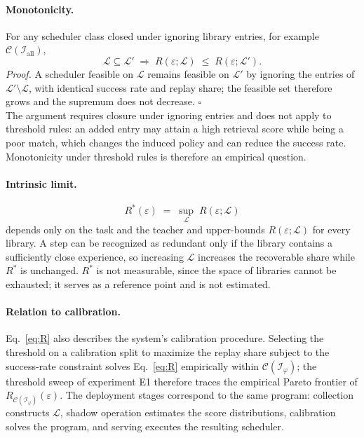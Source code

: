 \documentclass{article}
\begin{document}
\paragraph{Monotonicity.}
For any scheduler class closed under ignoring library entries, for example
$\mathcal{C}(\mathcal{I}_{\mathrm{all}})$,
\begin{equation}
\mathcal{L} \subseteq \mathcal{L}' \;\Longrightarrow\;
R(\varepsilon;\mathcal{L}) \;\le\; R(\varepsilon;\mathcal{L}') .
\label{eq:mono}
\end{equation}
\emph{Proof.} A scheduler feasible on $\mathcal{L}$ remains feasible on
$\mathcal{L}'$ by ignoring the entries of
$\mathcal{L}' \setminus \mathcal{L}$, with identical success rate and replay
share; the feasible set therefore grows and the supremum does not decrease.
\hfill$\square$\\
The argument requires closure under ignoring entries and does not apply to
threshold rules: an added entry may attain a high retrieval score while being a
poor match, which changes the induced policy and can reduce the success rate.
Monotonicity under threshold rules is therefore an empirical question.

\paragraph{Intrinsic limit.}
\begin{equation}
R^{*}(\varepsilon) \;=\; \sup_{\mathcal{L}}\; R(\varepsilon; \mathcal{L})
\label{eq:intrinsic}
\end{equation}
depends only on the task and the teacher and upper-bounds
$R(\varepsilon;\mathcal{L})$ for every library. A step can be recognized as
redundant only if the library contains a sufficiently close experience, so
increasing $\mathcal{L}$ increases the recoverable share while
$R^{*}$ is unchanged. $R^{*}$ is not measurable, since the space of libraries
cannot be exhausted; it serves as a reference point and is not estimated.

\paragraph{Relation to calibration.}
Eq.~\ref{eq:R} also describes the system's calibration procedure. Selecting
the threshold on a calibration split to maximize the replay share subject to
the success-rate constraint solves Eq.~\ref{eq:R} empirically within
$\mathcal{C}(\mathcal{I}_\varphi)$; the threshold sweep of experiment E1
therefore traces the empirical Pareto frontier of
$R_{\mathcal{C}(\mathcal{I}_\varphi)}(\varepsilon)$. The deployment stages
correspond to the same program: collection constructs $\mathcal{L}$, shadow
operation estimates the score distributions, calibration solves the program,
and serving executes the resulting scheduler.
\end{document}
